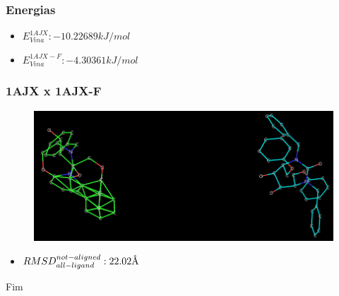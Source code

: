 \documentclass{beamer}
\newcommand{\angstrom}{\textup{\AA}}
\begin{document}
\begin{frame}
\frametitle{Energias}
\begin{itemize}
  \item $E_{Vina}^{1AJX}: -10.22689 kJ/mol$
  \item $E_{Vina}^{1AJX-F}: -4.30361 kJ/mol$  
\end{itemize} 
\end{frame}

\begin{frame}
\frametitle{1AJX x 1AJX-F}
\begin{figure}
\includegraphics[width=0.6\linewidth]{1AJX-F.png}
\end{figure}
\begin{itemize}
  \item $RMSD_{all-ligand}^{not-aligned}: 22.02\angstrom$ 
\end{itemize}
\end{frame}

\begin{frame}
\Huge{\centerline{Fim}}
\end{frame}

\end{document}
